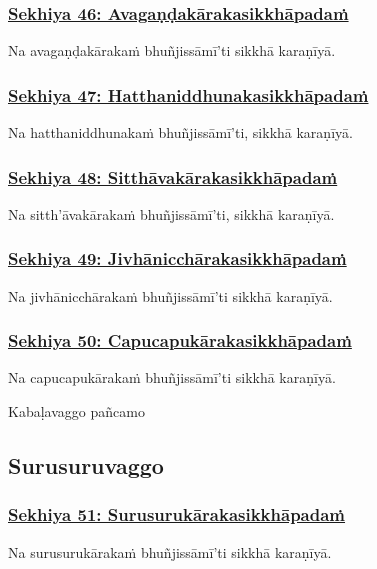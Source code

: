\subsubsection*{\hyperref[training46]{Sekhiya 46: Avagaṇḍakārakasikkhāpadaṁ}}
\label{sekh46}
Na avagaṇḍakārakaṁ bhuñjissāmī'ti sikkhā karaṇīyā.

\subsubsection*{\hyperref[training47]{Sekhiya 47: Hatthaniddhunakasikkhāpadaṁ}}
\label{sekh47}
Na hatthaniddhunakaṁ bhuñjissāmī'ti, sikkhā karaṇīyā.

\subsubsection*{\hyperref[training48]{Sekhiya 48: Sitthāvakārakasikkhāpadaṁ}}
\label{sekh48}
Na sitth'āvakārakaṁ bhuñjissāmī'ti, sikkhā karaṇīyā.

\subsubsection*{\hyperref[training49]{Sekhiya 49: Jivhānicchārakasikkhāpadaṁ}}
\label{sekh49}
Na jivhānicchārakaṁ bhuñjissāmī'ti sikkhā karaṇīyā.

\subsubsection*{\hyperref[training50]{Sekhiya 50: Capucapukārakasikkhāpadaṁ}}
\label{sekh50}
Na capucapukārakaṁ bhuñjissāmī'ti sikkhā karaṇīyā.

\begin{center}
  Kabaḷavaggo pañcamo
\end{center}

\subsection{Surusuruvaggo}
\vspace{0.2cm}

\subsubsection*{\hyperref[training51]{Sekhiya 51: Surusurukārakasikkhāpadaṁ}}
\label{sekh51}
Na surusurukārakaṁ bhuñjissāmī'ti sikkhā karaṇīyā.


